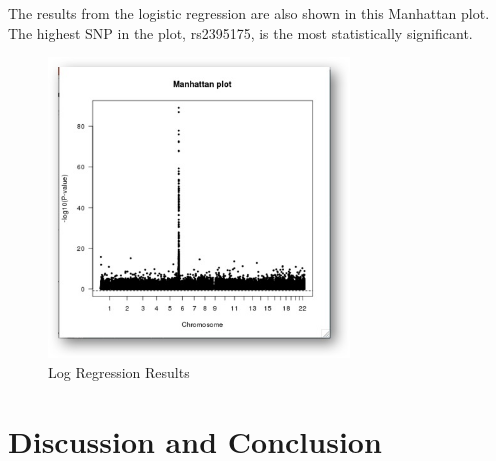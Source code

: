 \documentclass[12pt]{report}
\begin{document}
The results from the logistic regression are also shown in this Manhattan plot.
The highest SNP in the plot, rs2395175, is the most statistically significant.

\begin{figure}[H]
    \caption{Log Regression Results}
\label{Figure 2}
    \includegraphics[width=8cm]{figure_1}
    \centering
\end{figure}




\chapter{Discussion and Conclusion}





\end{document}
